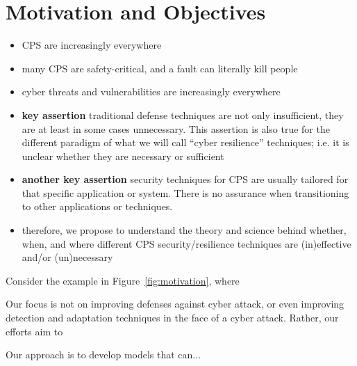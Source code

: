 
\section{Motivation and Objectives}

\begin{itemize}
    \item CPS are increasingly everywhere
    \item many CPS are safety-critical, and a fault can literally kill people
    \item cyber threats and vulnerabilities are increasingly everywhere
    \item {\bf key assertion} traditional defense techniques are not only insufficient, they are at least in some cases unnecessary. This assertion is also true for the different paradigm of what we will call ``cyber resilience'' techniques; i.e. it is unclear whether they are necessary or sufficient
    \item {\bf another key assertion}  security techniques for CPS are usually tailored for that specific application or system. There is no assurance when transitioning to other applications or techniques.
    \item therefore, we propose to understand the theory and science behind whether, when, and where different CPS security/resilience techniques are (in)effective and/or (un)necessary
\end{itemize}


Consider the example in Figure~\ref{fig:motivation}, where

\begin{figure}
\end{figure}

Our focus is not on improving defenses against cyber attack, or even improving detection and adaptation techniques in the face of a cyber attack. Rather, our efforts aim to


Our approach is to develop models that can...
\begin{figure}
\end{figure}